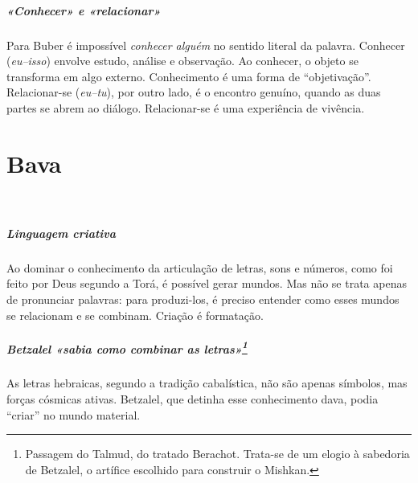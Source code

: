 \paragraph{«Conhecer» e «relacionar»} Para Buber é impossível \textit{conhecer alguém} no sentido literal da palavra. Conhecer (\textit{eu--isso}) envolve estudo, análise e observação. Ao conhecer, o objeto se transforma em algo externo. Conhecimento é uma forma de ``objetivação''. Relacionar-se (\textit{eu--tu}), por outro lado, é o encontro genuíno, quando as duas partes se abrem ao diálogo. Relacionar-se é uma experiência de vivência.

\chapter*{Bava 
\smallskip{}}

\begin{center}
{\huge{}}\\\medskip{\footnotesize\formularlight{
\lipsum[2]
}}
\end{center}


\paragraph{Linguagem criativa} Ao dominar o conhecimento da articulação de letras, sons e números, como foi feito por Deus segundo a Torá, é possível gerar mundos. Mas não se trata apenas de pronunciar palavras: para produzi-los, é preciso entender como esses mundos se relacionam e se combinam. Criação é formatação.

\paragraph{Betzalel «sabia como combinar as letras»\footnote{Passagem do Talmud, do tratado Berachot. Trata-se de um elogio à sabedoria de Betzalel, o artífice escolhido para construir o Mishkan.}} As letras hebraicas, segundo a tradição cabalística, não são apenas símbolos, mas forças cósmicas ativas. Betzalel, que detinha esse conhecimento dava, podia ``criar'' no mundo material.

